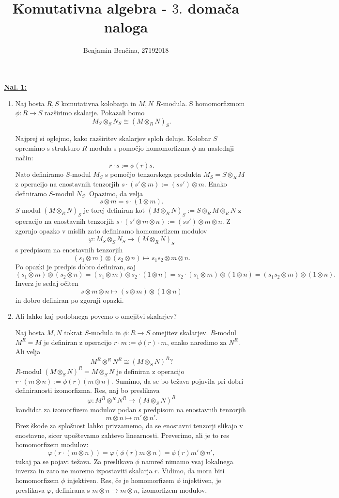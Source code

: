 \documentclass[a4paper, 12pt]{article} %
\title{Komutativna algebra - $3.$ domača naloga}
\author{Benjamin Benčina, 27192018}
\begin{document}
\maketitle

\underline{\textbf{Nal. 1:}}
\begin{enumerate}[label=(\alph*)]
	\item Naj bosta $R, S$ komutativna kolobarja in $M, N$ $R$-modula. S homomorfizmom $\phi\colon R \to S$ razširimo skalarje. Pokazali bomo
	\[
	M_S \otimes_S N_S \cong (M \otimes_R N)_S.
	\]
	
	Najprej si oglejmo, kako razširitev skalarjev sploh deluje. Kolobar $S$ opremimo s strukturo $R$-modula s pomočjo homomorfizma $\phi$ na naslednji način:
	\[
	r \cdot s := \phi(r)s.
	\]
	Nato definiramo $S$-modul $M_S$ s pomočjo tenzorskega produkta $M_S = S \otimes_R M$
	z operacijo na enostavnih tenzorjih $s \cdot (s' \otimes m) := (ss')\otimes m$.
	Enako definiramo $S$-modul $N_S$. Opazimo, da velja
	\[
	s \otimes m = s \cdot (1 \otimes m).
	\]
	$S$-modul $(M \otimes_R N)_S$ je torej definiran kot $(M \otimes_R N)_S := S \otimes_R M \otimes_R N$
	z operacijo na enostavnih tenzorjih $s \cdot (s' \otimes m \otimes n) := (ss') \otimes m \otimes n$.
	Z zgornjo opazko v mislih zato definiramo homomorfizem modulov
	\[
	\varphi\colon M_S \otimes_S N_S \to (M \otimes_R N)_S
	\]
	s predpisom na enostavnih tenzorjih
	\[
	(s_1 \otimes m)\otimes(s_2 \otimes n) \mapsto s_1s_2 \otimes m \otimes n.
	\]
	Po opazki je predpis dobro definiran, saj
	\[
	(s_1 \otimes m)\otimes(s_2 \otimes n) = (s_1 \otimes m)\otimes s_2 \cdot (1 \otimes n) = s_2\cdot (s_1 \otimes m)\otimes(1 \otimes n) = (s_1s_2 \otimes m)\otimes(1\otimes n).
	\]
	Inverz je sedaj očiten
	\[
	s \otimes m \otimes n \mapsto (s \otimes m) \otimes (1 \otimes n)
	\]
	in dobro definiran po zgornji opazki.
	\item Ali lahko kaj podobnega povemo o omejitvi skalarjev?
	
	Naj bosta $M,N$ tokrat $S$-modula in $\phi\colon R \to S$ omejitev skalarjev. $R$-modul $M^R = M$ je definiran z operacijo $r \cdot m := \phi(r)\cdot m$, enako naredimo za $N^R$. Ali velja
	\[
	M^R \otimes^R N^R \cong (M \otimes_S N)^R?
	\]
	$R$-modul $(M \otimes_S N)^R = M \otimes_S N$ je definiran z operacijo $r \cdot (m\otimes n) := \phi(r)(m\otimes n)$. Sumimo, da se bo težava pojavila pri dobri definiranosti izomorfizma. Res, naj bo preslikava
	\[
	\varphi\colon M^R \otimes^R N^R \to (M \otimes_S N)^R
	\]
	kandidat za izomorfizem modulov podan s predpisom na enostavnih tenzorjih
	\[
	m \otimes n \mapsto m' \otimes n'.
	\]
	Brez škode za splošnost lahko privzamemo, da se enostavni tenzorji slikajo v enostavne, sicer upoštevamo zahtevo linearnosti.
	Preverimo, ali je to res homomorfizem modulov:
	\[
	\varphi(r \cdot (m \otimes n)) = \varphi(\phi(r)m\otimes n) = \phi(r)m'\otimes n',
	\]
	tukaj pa se pojavi težava. Za preslikavo $\phi$ namreč nimamo vsaj lokalnega inverza in zato ne moremo izpostaviti skalarja $r$. Vidimo, da mora biti homomorfizem $\phi$ injektiven.
	Res, če je homomorfizem $\phi$ injektiven, je preslikava $\varphi$, definirana s $m \otimes n \to m \otimes n$, izomorfizem modulov.
\end{enumerate}
\end{document}
